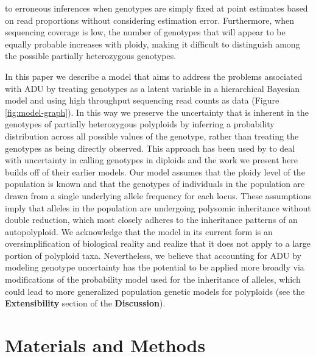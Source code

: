 \documentclass[11pt,english,letterpaper,oneside]{article}
\begin{document}
to erroneous inferences when genotypes are simply fixed at point estimates based on read proportions without considering estimation error. Furthermore, when sequencing coverage is low, the number of genotypes that will appear to be equally probable increases with ploidy, making it difficult to distinguish among the possible partially heterozygous genotypes.
\medskip

In this paper we describe a model that aims to address the problems associated with ADU by treating genotypes as a latent variable in a hierarchical Bayesian model and using high throughput sequencing read counts as data (Figure \ref{fig:model-graph}). In this way we preserve the uncertainty that is inherent in the genotypes of partially heterozygous polyploids by inferring a probability distribution across all possible values of the genotype, rather than treating the genotypes as being directly observed. This approach has been used by \cite{buerkle2013popModels} to deal with uncertainty in calling genotypes in diploids and the work we present here builds off of their earlier models. Our model assumes that the ploidy level of the population is known and that the genotypes of individuals in the population are drawn from a single underlying allele frequency for each locus. These assumptions imply that alleles in the population are undergoing polysomic inheritance without double reduction, which most closely adheres to the inheritance patterns of an autopolyploid. We acknowledge that the model in its current form is an oversimplification of biological reality and realize that it does not apply to a large portion of polyploid taxa. Nevertheless, we believe that accounting for ADU by modeling genotype uncertainty has the potential to be applied more broadly via modifications of the probability model used for the inheritance of alleles, which could lead to more generalized population genetic models for polyploids (see the \textbf{Extensibility} section of the \textbf{Discussion}).
\medskip

\section*{Materials and Methods}        %
\end{document}
